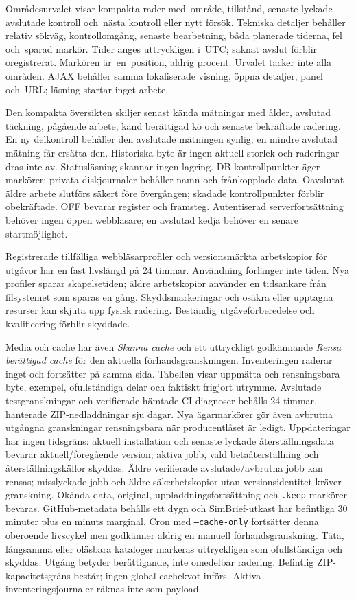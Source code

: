 \documentclass[11pt,a4paper]{article}
\begin{document}
Områdesurvalet visar kompakta rader med~område, tillstånd, senaste lyckade
avslutade kontroll och~nästa kontroll eller nytt försök. Tekniska detaljer
behåller relativ sökväg, kontrollomgång, senaste bearbetning, båda planerade
tiderna, fel och~sparad markör. Tider anges uttryckligen i~UTC; saknat avslut
förblir oregistrerat. Markören är~en~position, aldrig procent. Urvalet täcker
inte alla områden. AJAX behåller samma lokaliserade visning, öppna detaljer,
panel och~URL; läsning startar inget arbete.

Den kompakta översikten skiljer senast kända mätningar med ålder, avslutad
täckning, pågående arbete, känd berättigad kö och senaste bekräftade radering.
En ny delkontroll behåller den avslutade mätningen synlig; en mindre avslutad
mätning får ersätta den. Historiska byte är ingen aktuell storlek och raderingar
dras inte av. Statusläsning skannar ingen lagring. DB-kontrollpunkter äger
markörer; privata diskjournaler behåller namn och frånkopplade data. Oavslutat
äldre arbete slutförs säkert före övergången; skadade kontrollpunkter förblir
obekräftade. OFF bevarar register och framsteg. Autentiserad serverfortsättning
behöver ingen öppen webbläsare; en avslutad kedja behöver en senare
startmöjlighet.

Registrerade tillfälliga webbläsarprofiler och versionsmärkta arbetskopior för
utgåvor har en fast livslängd på 24 timmar. Användning förlänger inte tiden.
Nya profiler sparar skapelsetiden; äldre arbetskopior använder en tidsankare
från
filsystemet som sparas en gång. Skyddsmarkeringar och osäkra eller upptagna
resurser kan skjuta upp fysisk radering. Beständig utgåveförberedelse och
kvalificering förblir skyddade.

Media och cache har även \emph{Skanna cache} och ett uttryckligt godkännande
\emph{Rensa berättigad cache} för den aktuella förhandsgranskningen.
Inventeringen
raderar inget och fortsätter på samma sida. Tabellen visar uppmätta och
rensningsbara byte, exempel, ofullständiga delar och faktiskt frigjort utrymme.
Avslutade testgranskningar och verifierade hämtade CI-diagnoser behålls 24
timmar,
hanterade ZIP-nedladdningar sju dagar. Nya ägarmarkörer gör även avbrutna
utgångna granskningar rensningsbara när producentlåset är ledigt. Uppdateringar
har ingen tidsgräns: aktuell installation och senaste lyckade återställningsdata
bevarar aktuell/föregående version; aktiva jobb, vald betaåterställning och
återställningskällor skyddas. Äldre verifierade avslutade/avbrutna jobb kan
rensas;
misslyckade jobb och äldre säkerhetskopior utan versionsidentitet kräver
granskning.
Okända data, original, uppladdningsfortsättning och \texttt{.keep}-markörer
bevaras.
GitHub-metadata behålls ett dygn och SimBrief-utkast har befintliga 30 minuter
plus en minuts marginal. Cron med \texttt{--cache-only} fortsätter denna
oberoende
livscykel men godkänner aldrig en manuell förhandsgranskning. Täta, långsamma
eller
oläsbara kataloger markeras uttryckligen som ofullständiga och skyddas. Utgång
betyder berättigande, inte omedelbar radering. Befintlig ZIP-kapacitetsgräns
består;
ingen global cachekvot införs. Aktiva inventeringsjournaler räknas inte som
payload.
\end{document}
